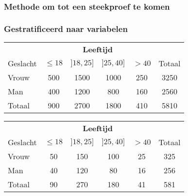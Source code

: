 \documentclass[aspectratio=169]{beamer}
\begin{document}
\begin{frame}
  \frametitle{Methode om tot een steekproef te komen}
  \begin{center}
  \end{center}
  
\end{frame}

\begin{frame}
  \frametitle{Gestratificeerd naar variabelen}
  
  \begin{center}
    \begin{tabular}{l|cccc|c}
      & \multicolumn{4}{c|}{\textbf{Leeftijd}} & \\
      Geslacht & $\le 18$ & $]18,25]$ & $]25, 40]$ & $> 40$ & Totaal\\
      \hline
      Vrouw & 500 & 1500 & 1000 & 250 & 3250 \\
      Man   & 400 & 1200 & 800 & 160 & 2560\\
      \hline
      Totaal & 900 & 2700 & 1800 & 410 & 5810
    \end{tabular}
    
    \vspace{.5cm}
    
    \pause
    \begin{tabular}{l|cccc|c}
      & \multicolumn{4}{c|}{\textbf{Leeftijd}} & \\
      Geslacht & $\le 18$ & $]18,25]$ & $]25, 40]$ & $> 40$ & Totaal\\
      \hline
      Vrouw & 50 & 150 & 100 & 25 & 325 \\
      Man   & 40 & 120 & 80 & 16 & 256\\
      \hline
      Totaal & 90 & 270 & 180 & 41 & 581
    \end{tabular}
    
  \end{center}
\end{frame}
\end{document}

